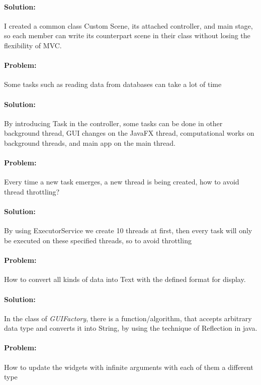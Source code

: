 \documentclass[a4paper,12pt]{report}
\begin{document}
    \paragraph*{Solution:}I created a common class Custom Scene, its attached controller, and main stage, so each member can write its counterpart scene in their class without losing the flexibility of MVC.

    \paragraph{Problem:}Some tasks such as reading data from databases can take a lot of time

    \paragraph*{Solution:}By introducing Task in the controller, some tasks can be done in other background thread,  GUI changes on the JavaFX thread, computational works on background threads, and main app on the main thread. 

    \paragraph{Problem:}Every time a new task emerges, a new thread is being created, how to avoid thread throttling?

    \paragraph*{Solution:}By using ExecutorService we create 10 threads at first, then every task will only be executed on these specified threads, so to avoid throttling

    \paragraph{Problem:}How to convert all kinds of data into Text with the defined format for display.

    \paragraph*{Solution:}In the class of \textit{GUIFactory}, there is a function/algorithm, that accepts arbitrary data type and converts it into String, by using the technique of Reflection in java.

    \paragraph{Problem:}How to update the  widgets with infinite arguments with each of them a different type
\end{document}
